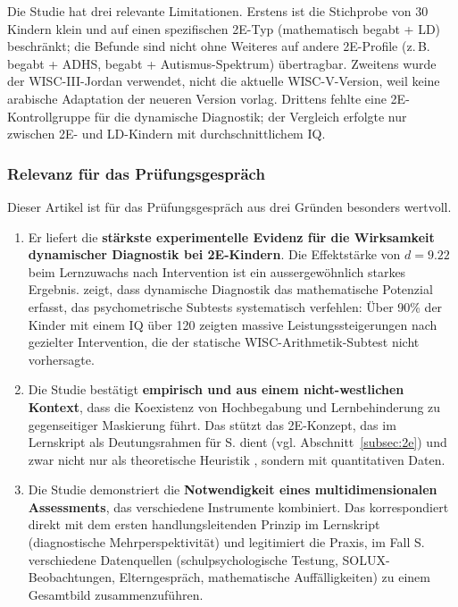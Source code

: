 \documentclass[ngerman, a4paper]{article}
\begin{document}
Die Studie hat drei relevante Limitationen. Erstens ist die Stichprobe von
30 Kindern klein und auf einen spezifischen 2E-Typ (mathematisch begabt +
LD) beschränkt; die Befunde sind nicht ohne Weiteres auf andere 2E-Profile
(z.\,B. begabt + ADHS, begabt + Autismus-Spektrum) übertragbar. Zweitens
wurde der WISC-III-Jordan verwendet, nicht die aktuelle WISC-V-Version,
weil keine arabische Adaptation der neueren Version vorlag. Drittens fehlte
eine 2E-Kontrollgruppe für die dynamische Diagnostik; der Vergleich
erfolgte nur zwischen 2E- und LD-Kindern mit durchschnittlichem IQ.

\subsubsection*{Relevanz für das Prüfungsgespräch}

Dieser Artikel ist für das Prüfungsgespräch aus drei Gründen besonders
wertvoll.

\begin{enumerate}
  \item Er liefert die \textbf{stärkste experimentelle Evidenz für die
          Wirksamkeit dynamischer Diagnostik bei 2E-Kindern}. Die Effektstärke
        von $d = 9.22$ beim Lernzuwachs nach Intervention ist ein
        aussergewöhnlich starkes Ergebnis. \textcite{alhroub2021utility} zeigt, dass dynamische
        Diagnostik das mathematische Potenzial erfasst, das psychometrische
        Subtests systematisch verfehlen: Über 90\% der Kinder mit einem IQ
        über 120 zeigten massive Leistungssteigerungen nach gezielter
        Intervention, die der statische WISC-Arithmetik-Subtest nicht
        vorhersagte.
  \item Die Studie bestätigt \textbf{empirisch und aus einem
          nicht-westlichen Kontext}, dass die Koexistenz von Hochbegabung und
        Lernbehinderung zu gegenseitiger Maskierung führt. Das stützt das
        2E-Konzept, das im Lernskript als Deutungsrahmen für S. dient
        (vgl. Abschnitt~\ref{subsec:2e}) und zwar nicht nur als theoretische
        Heuristik \parencite{webb2020doppeldiagnosen}, sondern mit
        quantitativen Daten.
  \item Die Studie demonstriert die \textbf{Notwendigkeit eines
          multidimensionalen Assessments}, das verschiedene Instrumente
        kombiniert. Das korrespondiert direkt mit dem ersten
        handlungsleitenden Prinzip im Lernskript (diagnostische
        Mehrperspektivität) und legitimiert die Praxis, im Fall S.
        verschiedene Datenquellen (schulpsychologische Testung,
        SOLUX-Beobachtungen, Elterngespräch, mathematische Auffälligkeiten)
        zu einem Gesamtbild zusammenzuführen.
\end{enumerate}
\end{document}
